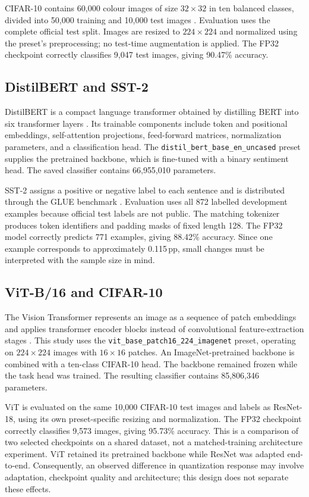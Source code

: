 \documentclass[conference]{IEEEtran}
\newcommand{\pp}{\,pp}
\begin{document}
CIFAR-10 contains 60,000 colour images of size $32\times32$ in ten balanced classes, divided into 50,000 training and 10,000 test images \cite{krizhevsky2009}. Evaluation uses the complete official test split. Images are resized to $224\times224$ and normalized using the preset's preprocessing; no test-time augmentation is applied. The FP32 checkpoint correctly classifies 9,047 test images, giving 90.47\% accuracy.

\subsection{DistilBERT and SST-2}

DistilBERT is a compact language transformer obtained by distilling BERT into six transformer layers \cite{sanh2019}. Its trainable components include token and positional embeddings, self-attention projections, feed-forward matrices, normalization parameters, and a classification head. The \texttt{distil\_bert\_base\_en\_uncased} preset supplies the pretrained backbone, which is fine-tuned with a binary sentiment head. The saved classifier contains 66,955,010 parameters.

SST-2 assigns a positive or negative label to each sentence and is distributed through the GLUE benchmark \cite{socher2013,wang2018}. Evaluation uses all 872 labelled development examples because official test labels are not public. The matching tokenizer produces token identifiers and padding masks of fixed length 128. The FP32 model correctly predicts 771 examples, giving 88.42\% accuracy. Since one example corresponds to approximately 0.115\pp{}, small changes must be interpreted with the sample size in mind.

\subsection{ViT-B/16 and CIFAR-10}

The Vision Transformer represents an image as a sequence of patch embeddings and applies transformer encoder blocks instead of convolutional feature-extraction stages \cite{dosovitskiy2021}. This study uses the \texttt{vit\_base\_patch16\_224\_imagenet} preset, operating on $224\times224$ images with $16\times16$ patches. An ImageNet-pretrained backbone is combined with a ten-class CIFAR-10 head. The backbone remained frozen while the task head was trained. The resulting classifier contains 85,806,346 parameters.

ViT is evaluated on the same 10,000 CIFAR-10 test images and labels as ResNet-18, using its own preset-specific resizing and normalization. The FP32 checkpoint correctly classifies 9,573 images, giving 95.73\% accuracy. This is a comparison of two selected checkpoints on a shared dataset, not a matched-training architecture experiment. ViT retained its pretrained backbone while ResNet was adapted end-to-end. Consequently, an observed difference in quantization response may involve adaptation, checkpoint quality and architecture; this design does not separate these effects.
\end{document}
